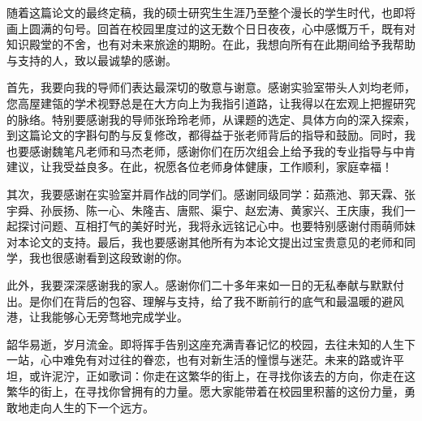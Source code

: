 




随着这篇论文的最终定稿，我的硕士研究生生涯乃至整个漫长的学生时代，也即将画上圆满的句号。回首在校园里度过的这无数个日日夜夜，心中感慨万千，既有对知识殿堂的不舍，也有对未来旅途的期盼。在此，我想向所有在此期间给予我帮助与支持的人，致以最诚挚的感谢。

首先，我要向我的导师们表达最深切的敬意与谢意。感谢实验室带头人刘均老师，您高屋建瓴的学术视野总是在大方向上为我指引道路，让我得以在宏观上把握研究的脉络。特别要感谢我的导师张玲玲老师，从课题的选定、具体方向的深入探索，到这篇论文的字斟句酌与反复修改，都得益于张老师背后的指导和鼓励。同时，我也要感谢魏笔凡老师和马杰老师，感谢你们在历次组会上给予我的专业指导与中肯建议，让我受益良多。在此，祝愿各位老师身体健康，工作顺利，家庭幸福！

其次，我要感谢在实验室并肩作战的同学们。感谢同级同学：茹燕池、郭天霖、张宇舜、孙辰扬、陈一心、朱隆吉、唐熙、渠宁、赵宏涛、黄家兴、王庆康，我们一起探讨问题、互相打气的美好时光，我将永远铭记心中。也要特别感谢付雨萌师妹对本论文的支持。最后，我也要感谢其他所有为本论文提出过宝贵意见的老师和同学，我也很感谢看到这段致谢的你。

此外，我要深深感谢我的家人。感谢你们二十多年来如一日的无私奉献与默默付出。是你们在背后的包容、理解与支持，给了我不断前行的底气和最温暖的避风港，让我能够心无旁骛地完成学业。

韶华易逝，岁月流金。即将挥手告别这座充满青春记忆的校园，去往未知的人生下一站，心中难免有对过往的眷恋，也有对新生活的憧憬与迷茫。未来的路或许平坦，或许泥泞，正如歌词：你走在这繁华的街上，在寻找你该去的方向，你走在这繁华的街上，在寻找你曾拥有的力量。愿大家能带着在校园里积蓄的这份力量，勇敢地走向人生的下一个远方。


